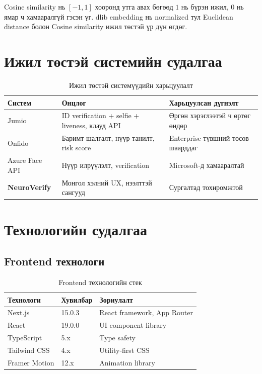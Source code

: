 \documentclass[12pt,a4paper]{article}
\begin{document}
Cosine similarity нь $[-1, 1]$ хооронд утга авах бөгөөд $1$ нь бүрэн ижил, $0$ нь ямар ч хамааралгүй гэсэн үг. dlib embedding нь normalized тул Euclidean distance болон Cosine similarity ижил төстэй үр дүн өгдөг.

\section{Ижил төстэй системийн судалгаа}

\begin{table}[H]
\centering
\begin{tabular}{|p{2.8cm}|p{4.5cm}|p{5.5cm}|}
\hline
\textbf{Систем} & \textbf{Онцлог} & \textbf{Харьцуулсан дүгнэлт} \\
\hline
Jumio & ID verification + selfie + liveness, клауд API & Өргөн хэрэглээтэй ч өртөг өндөр \\
\hline
Onfido & Баримт шалгалт, нүүр танилт, risk score & Enterprise түвшний төсөв шаарддаг \\
\hline
Azure Face API & Нүүр илрүүлэлт, verification & Microsoft-д хамааралтай \\
\hline
\textbf{NeuroVerify} & Монгол хэлний UX, нээлттэй сангууд & Сургалтад тохиромжтой \\
\hline
\end{tabular}
\caption{Ижил төстэй системүүдийн харьцуулалт}
\end{table}

\section{Технологийн судалгаа}

\subsection{Frontend технологи}

\begin{table}[H]
\centering
\begin{tabular}{|p{3.5cm}|p{2cm}|p{7cm}|}
\hline
\textbf{Технологи} & \textbf{Хувилбар} & \textbf{Зориулалт} \\
\hline
Next.js & 15.0.3 & React framework, App Router \\
\hline
React & 19.0.0 & UI component library \\
\hline
TypeScript & 5.x & Type safety \\
\hline
Tailwind CSS & 4.x & Utility-first CSS \\
\hline
Framer Motion & 12.x & Animation library \\
\hline
\end{tabular}
\caption{Frontend технологийн стек}
\end{table}
\end{document}
